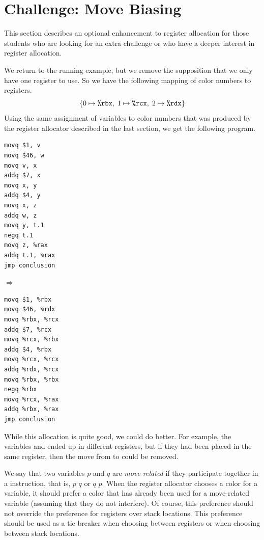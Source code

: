 \documentclass[11pt]{book}
\begin{document}
\section{Challenge: Move Biasing}
\label{sec:move-biasing}

This section describes an optional enhancement to register allocation
for those students who are looking for an extra challenge or who have
a deeper interest in register allocation.

We return to the running example, but we remove the supposition that
we only have one register to use. So we have the following mapping of
color numbers to registers.
\[
  \{ 0 \mapsto \texttt{\%rbx}, \; 1 \mapsto \texttt{\%rcx}, \; 2 \mapsto \texttt{\%rdx} \}
\]
Using the same assignment of variables to color numbers that was
produced by the register allocator described in the last section, we
get the following program.

\begin{minipage}{0.3\textwidth}
\begin{lstlisting}
movq $1, v
movq $46, w
movq v, x
addq $7, x
movq x, y
addq $4, y
movq x, z
addq w, z
movq y, t.1
negq t.1
movq z, %rax
addq t.1, %rax
jmp conclusion
\end{lstlisting}
\end{minipage}
$\Rightarrow\qquad$
\begin{minipage}{0.45\textwidth}
\begin{lstlisting}
movq $1, %rbx
movq $46, %rdx
movq %rbx, %rcx
addq $7, %rcx
movq %rcx, %rbx
addq $4, %rbx
movq %rcx, %rcx
addq %rdx, %rcx
movq %rbx, %rbx
negq %rbx
movq %rcx, %rax
addq %rbx, %rax
jmp conclusion
\end{lstlisting}
\end{minipage}

While this allocation is quite good, we could do better. For example,
the variables  and  ended up in different registers, but
if they had been placed in the same register, then the move from
 to  could be removed.

We say that two variables $p$ and $q$ are \emph{move related} if they
participate together in a  instruction, that is, 
$p$\key{,} $q$ or  $q$\key{,} $p$. When the register
allocator chooses a color for a variable, it should prefer a color
that has already been used for a move-related variable (assuming that
they do not interfere). Of course, this preference should not override
the preference for registers over stack locations. This preference
should be used as a tie breaker when choosing between registers or
when choosing between stack locations.
\end{document}
